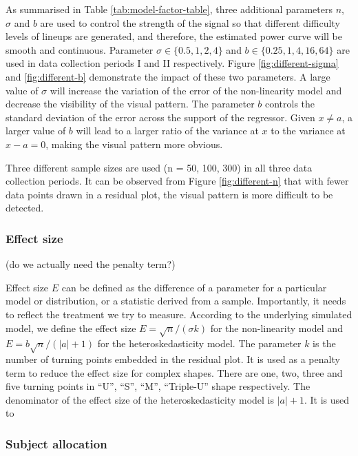 \documentclass[]{interact}
\theoremstyle{plain}%
\theoremstyle{definition}
\theoremstyle{remark}
\begin{document}
As summarised in Table \ref{tab:model-factor-table}, three additional
parameters \(n\), \(\sigma\) and \(b\) are used to control the strength
of the signal so that different difficulty levels of lineups are
generated, and therefore, the estimated power curve will be smooth and
continuous. Parameter \(\sigma \in \{0.5, 1, 2, 4\}\) and
\(b \in \{0.25, 1, 4, 16, 64\}\) are used in data collection periods I
and II respectively. Figure \ref{fig:different-sigma} and
\ref{fig:different-b} demonstrate the impact of these two parameters. A
large value of \(\sigma\) will increase the variation of the error of
the non-linearity model and decrease the visibility of the visual
pattern. The parameter \(b\) controls the standard deviation of the
error across the support of the regressor. Given \(x \neq a\), a larger
value of \(b\) will lead to a larger ratio of the variance at \(x\) to
the variance at \(x - a = 0\), making the visual pattern more obvious.

Three different sample sizes are used (n = 50, 100, 300) in all three
data collection periods. It can be observed from Figure
\ref{fig:different-n} that with fewer data points drawn in a residual
plot, the visual pattern is more difficult to be detected.

\hypertarget{effect-size}{%
\subsubsection{Effect size}\label{effect-size}}

(do we actually need the penalty term?)

Effect size \(E\) can be defined as the difference of a parameter for a
particular model or distribution, or a statistic derived from a sample.
Importantly, it needs to reflect the treatment we try to measure.
According to the underlying simulated model, we define the effect size
\(E = \sqrt{n}/(\sigma k)\) for the non-linearity model and
\(E = b\sqrt{n}/(|a| + 1)\) for the heteroskedasticity model. The
parameter \(k\) is the number of turning points embedded in the residual
plot. It is used as a penalty term to reduce the effect size for complex
shapes. There are one, two, three and five turning points in ``U'',
``S'', ``M'', ``Triple-U'' shape respectively. The denominator of the
effect size of the heteroskedasticity model is \(|a| + 1\). It is used
to

\hypertarget{subject-allocation}{%
\subsubsection{Subject allocation}\label{subject-allocation}}
\end{document}
